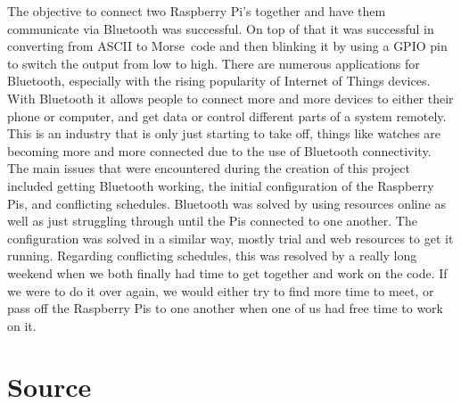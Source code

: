 \documentclass[11pt]{article}
\begin{document}
The objective to connect two Raspberry Pi's together and have them communicate via Bluetooth was successful.
On top of that it was successful in converting from ASCII to Morse~code and then blinking it by using a GPIO pin to switch the output from low to high.
There are numerous applications for Bluetooth, especially with the rising popularity of Internet of Things devices.
With Bluetooth it allows people to connect more and more devices to either their phone or computer, and get data or control different parts of a system remotely.
This is an industry that is only just starting to take off, things like watches are becoming more and more connected due to the use of Bluetooth connectivity.
The main issues that were encountered during the creation of this project included getting Bluetooth working, the initial configuration of the Raspberry Pis, and conflicting schedules.
Bluetooth was solved by using resources online as well as just struggling through until the Pis connected to one another.
The configuration was solved in a similar way, mostly trial and web resources to get it running.
Regarding conflicting schedules, this was resolved by a really long weekend when we both finally had time to get together and work on the code.
If we were to do it over again, we would either try to find more time to meet, or pass off the Raspberry Pis to one another when one of us had free time to work on it.


\section{Source}
\label{sec:source}



\end{document}
